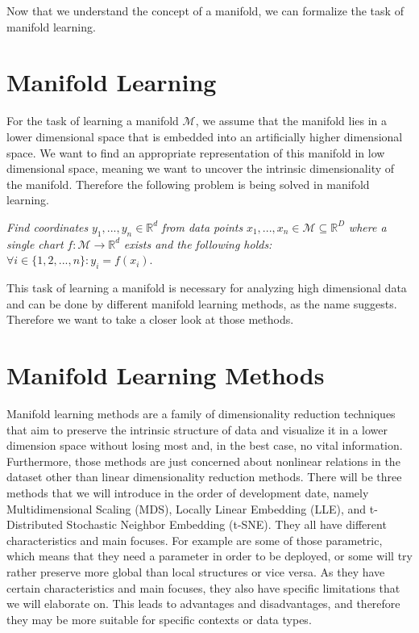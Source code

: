 Now that we understand the concept of a manifold, we can formalize the task of manifold learning.

\section{Manifold Learning}

For the task of learning a manifold $\mathcal{M}$, we assume that the manifold lies in a lower dimensional space that is embedded into an artificially higher dimensional space. We want to find an appropriate representation of this manifold in low dimensional space, meaning we want to uncover the intrinsic dimensionality of the manifold. Therefore the following problem is being solved in manifold learning. \cite{Cayton05}

\begin{task}
    \textit{Find coordinates} $y_1,...,y_n \in \mathbb{R}^d$ \textit{from data points} $x_1,...,x_n\in \mathcal{M} \subseteq \mathbb{R}^D$ \textit{where a single chart} $f: \mathcal{M} \to \mathbb{R}^d$ \textit{exists and the following holds:} $\forall i \in \{ 1,2,...,n \} : y_i=f(x_i)$.
\end{task}

This task of learning a manifold is necessary for analyzing high dimensional data and can be done by different manifold learning methods, as the name suggests. Therefore we want to take a closer look at those methods.

\section{Manifold Learning Methods}

Manifold learning methods are a family of dimensionality reduction techniques that aim to preserve the intrinsic structure of data and visualize it in a lower dimension space without losing most and, in the best case, no vital information. Furthermore, those methods are just concerned about nonlinear relations in the dataset other than linear dimensionality reduction methods. There will be three methods that we will introduce in the order of development date, namely Multidimensional Scaling (MDS), Locally Linear Embedding (LLE), and t-Distributed Stochastic Neighbor Embedding (t-SNE). They all have different characteristics and main focuses. For example are some of those parametric, which means that they need a parameter in order to be deployed, or some will try rather preserve more global than local structures or vice versa. As they have certain characteristics and main focuses, they also have specific limitations that we will elaborate on. This leads to advantages and disadvantages, and therefore they may be more suitable for specific contexts or data types.

